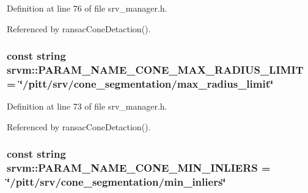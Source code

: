 Definition at line 76 of file srv\-\_\-manager.\-h.



Referenced by ransac\-Cone\-Detaction().

\hypertarget{namespacesrvm_a684755d042c9407cf88fcc81ca6a5712}{
\subsubsection[{P\-A\-R\-A\-M\-\_\-\-N\-A\-M\-E\-\_\-\-C\-O\-N\-E\-\_\-\-M\-A\-X\-\_\-\-R\-A\-D\-I\-U\-S\-\_\-\-L\-I\-M\-I\-T}]{\setlength{\rightskip}{0pt plus 5cm}const string srvm\-::\-P\-A\-R\-A\-M\-\_\-\-N\-A\-M\-E\-\_\-\-C\-O\-N\-E\-\_\-\-M\-A\-X\-\_\-\-R\-A\-D\-I\-U\-S\-\_\-\-L\-I\-M\-I\-T = \char`\"{}/pitt/srv/cone\-\_\-segmentation/max\-\_\-radius\-\_\-limit\char`\"{}}}\label{namespacesrvm_a684755d042c9407cf88fcc81ca6a5712}


Definition at line 73 of file srv\-\_\-manager.\-h.



Referenced by ransac\-Cone\-Detaction().

\hypertarget{namespacesrvm_a228bc70cd1578c12026757a28b369ea1}{
\subsubsection[{P\-A\-R\-A\-M\-\_\-\-N\-A\-M\-E\-\_\-\-C\-O\-N\-E\-\_\-\-M\-I\-N\-\_\-\-I\-N\-L\-I\-E\-R\-S}]{\setlength{\rightskip}{0pt plus 5cm}const string srvm\-::\-P\-A\-R\-A\-M\-\_\-\-N\-A\-M\-E\-\_\-\-C\-O\-N\-E\-\_\-\-M\-I\-N\-\_\-\-I\-N\-L\-I\-E\-R\-S = \char`\"{}/pitt/srv/cone\-\_\-segmentation/min\-\_\-inliers\char`\"{}}}\label{namespacesrvm_a228bc70cd1578c12026757a28b369ea1}


